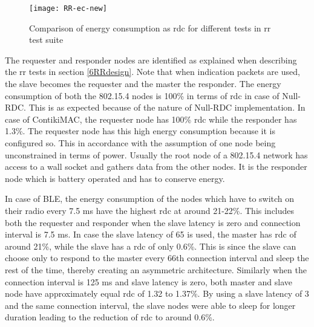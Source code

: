 \begin{figure}[b]
\texttt{[image: RR-ec-new]}
\caption{Comparison of energy consumption as \gls{rdc} for different tests in \gls{rr} test suite}
\label{fig:RR-ec}
\end{figure}

The requester and responder nodes are identified as explained when describing the \gls{rr} tests in section \ref{6RRdesign}. Note that when indication packets are used, the slave becomes the requester and the master the responder.
The energy consumption of both the 802.15.4 nodes is 100\% in terms of \gls{rdc} in case of Null-RDC. This is as expected because of the nature of Null-RDC implementation. In case of ContikiMAC, the requester node has 100\% \gls{rdc} while the responder has 1.3\%. The requester node has this high energy consumption because it is configured so. This in accordance with the assumption of one node being unconstrained in terms of power. Usually the root node of a 802.15.4 network has access to a wall socket and gathers data from the other nodes. It is the responder node which is battery operated and has to conserve energy. 

In case of BLE, the energy consumption of the nodes which have to switch on their radio every 7.5 ms have the highest \gls{rdc} at around 21-22\%. This includes both the requester and responder when the slave latency is zero and connection interval is 7.5 ms. In case the slave latency of 65 is used, the master has \gls{rdc} of around 21\%, while the slave has a \gls{rdc} of only 0.6\%. This is since the slave  can choose only to respond to the master every 66th connection interval and sleep the rest of the time, thereby creating an asymmetric architecture. Similarly when the connection interval is 125 ms and slave latency is zero, both master and slave node have approximately equal \gls{rdc} of 1.32 to 1.37\%. By using a slave latency of 3 and the same connection interval, the slave nodes were able to sleep for longer duration leading to the reduction of \gls{rdc} to around 0.6\%.
%
%

